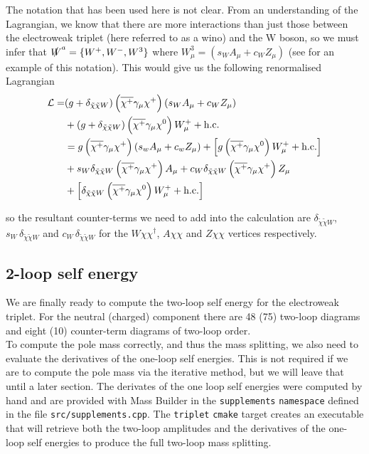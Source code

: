 \documentclass[11pt]{article}
\newcommand{\mychi}{\raisebox{0pt}[1ex][1ex]{$\chi$}}
\newcommand{\mb}{\textsf{Mass Builder} \! }
\begin{document}
The notation that has been used here is not clear.  From an understanding of the Lagrangian, we know that there are more interactions than just those between the electroweak triplet (here referred to as a wino) and the W boson, so we must infer that $ \slashed{W}^a = \{W^+,W^-,W^3\}$ where $W_{\mu}^3 = (s_W A_{\mu}+c_W Z_{\mu})$ (see \cite{Ostdiek2015} for an example of this notation).  This would give us the following renormalised Lagrangian
\begin{align}
\begin{split}
\mathcal{L}=
&(g+\delta_{\tilde{\chi} \tilde{\chi} W})\left(\overline{\mychi^+}\gamma_{\mu}\mychi^+\right)\left(s_WA_{\mu}+c_WZ_{\mu}\right)\\
&+(g+\delta_{\tilde{\chi} \tilde{\chi} W})\left(\overline{\mychi^+}\gamma_{\mu}\mychi^0 \right)W_{\mu}^++\text{h.c.}\\
&=g\left(\overline{\mychi^+}\gamma_{\mu}\mychi^+\right)\left(s_wA_{\mu}+c_wZ_{\mu}\right)+\left[g\left(\overline{\mychi^+}\gamma_{\mu}\mychi^0 \right)W_{\mu}^++\text{h.c.}\right]\\
&+s_W\delta_{\tilde{\chi} \tilde{\chi} W}\left(\overline{\mychi^+}\gamma_{\mu}\mychi^+\right)A_{\mu}+c_W\delta_{\tilde{\chi} \tilde{\chi} W}\left(\overline{\mychi^+}\gamma_{\mu}\mychi^+\right)Z_{\mu}\\
&+\left[\delta_{\tilde{\chi} \tilde{\chi} W}\left(\overline{\mychi^+}\gamma_{\mu}\mychi^0 \right)W_{\mu}^++\text{h.c.}\right]\\
\end{split}
\end{align}

so the resultant counter-terms we need to add into the calculation are $\delta_{\tilde{\chi} \tilde{\chi} W}$, $s_W\,\delta_{\tilde{\chi} \tilde{\chi} W}$ and $c_W\,\delta_{\tilde{\chi} \tilde{\chi} W}$ for the $W\chi\chi^{\dagger}$, $A\chi\chi$ and $Z\chi\chi$ vertices respectively.
\newpage
\subsection{2-loop self energy}

We are finally ready to compute the two-loop self energy for the electroweak triplet.  For the neutral (charged) component there are 48 (75) two-loop diagrams and eight (10) counter-term diagrams of two-loop order.\\

To compute the pole mass correctly, and thus the mass splitting, we also need to evaluate the derivatives of the one-loop self energies.  This is not required if we are to compute the pole mass via the iterative method, but we will leave that until a later section.  The derivates of the one loop self energies were computed by hand and are provided with \mb in the \lstinline{supplements} \lstinline{namespace} defined in the file \lstinline{src/supplements.cpp}.  The \lstinline{triplet} \lstinline{cmake} target creates an executable that will retrieve both the two-loop amplitudes and the derivatives of the one-loop self energies to produce the full two-loop mass splitting.\\
\end{document}
